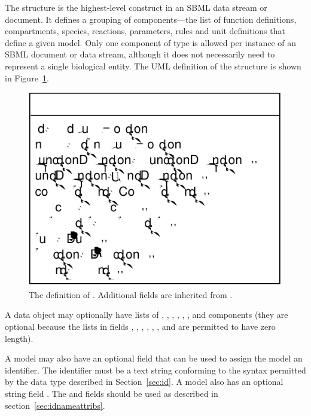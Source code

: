 \documentclass[10pt,twocolumntoc]{cekarticle}
\newcommand{\vref}[1]{\ref{#1}}
\begin{document}
The  structure is the highest-level construct in an
SBML data stream or document.  It defines a grouping of
components---the list of function definitions, compartments, species,
reactions, parameters, rules and unit definitions that
define a given model. Only one component of type  is
allowed per instance of an SBML document or data stream, although
it does not necessarily need to represent a single biological
entity.  The UML definition of the  structure is
shown in Figure~\vref{fig:model}.

\begin{figure}[htb]
  \centering
  \includegraphics[scale = 0.68]{model}
  \caption{The definition of .  Additional fields are
    inherited from .}
  \label{fig:model}
\end{figure}

A  data object may optionally have lists of ,
, , ,
, , and  components (they are
optional because the lists in fields ,
, , ,
, , and  are permitted to
have zero length).

A model may also have an optional  field that can be
used to assign the model an identifier. The identifier must be a
text string conforming to the syntax permitted by the 
data type described in Section~\ref{sec:id}. A model also has an
optional string field .  The  and
 fields should be used as described in
section~\ref{sec:idnameattribs}.
\end{document}
